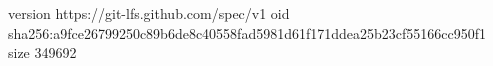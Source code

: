 version https://git-lfs.github.com/spec/v1
oid sha256:a9fce26799250c89b6de8c40558fad5981d61f171ddea25b23cf55166cc950f1
size 349692
